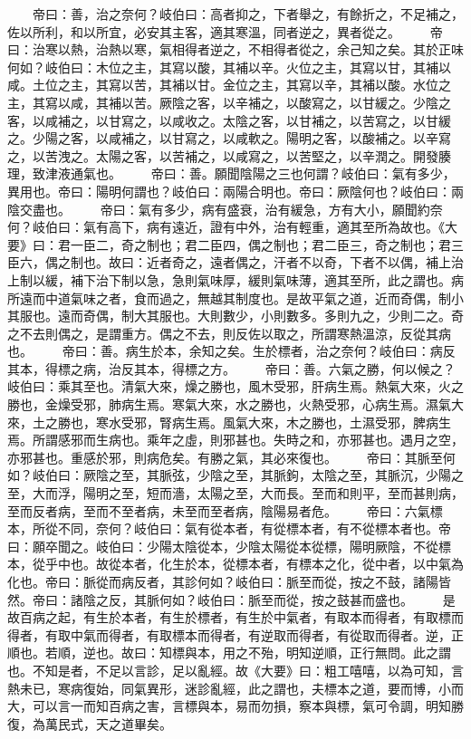　　帝曰：善，治之奈何？岐伯曰：高者抑之，下者舉之，有餘折之，不足補之，佐以所利，和以所宜，必安其主客，適其寒溫，同者逆之，異者從之。
　　帝曰：治寒以熱，治熱以寒，氣相得者逆之，不相得者從之，余己知之矣。其於正味何如？岐伯曰：木位之主，其寫以酸，其補以辛。火位之主，其寫以甘，其補以咸。土位之主，其寫以苦，其補以甘。金位之主，其寫以辛，其補以酸。水位之主，其寫以咸，其補以苦。厥陰之客，以辛補之，以酸寫之，以甘緩之。少陰之客，以咸補之，以甘寫之，以咸收之。太陰之客，以甘補之，以苦寫之，以甘緩之。少陽之客，以咸補之，以甘寫之，以咸軟之。陽明之客，以酸補之。以辛寫之，以苦洩之。太陽之客，以苦補之，以咸寫之，以苦堅之，以辛潤之。開發腠理，致津液通氣也。
　　帝曰：善。願聞陰陽之三也何謂？岐伯曰：氣有多少，異用也。帝曰：陽明何謂也？岐伯曰：兩陽合明也。帝曰：厥陰何也？岐伯曰：兩陰交盡也。
　　帝曰：氣有多少，病有盛衰，治有緩急，方有大小，願聞約奈何？岐伯曰：氣有高下，病有遠近，證有中外，治有輕重，適其至所為故也。《大要》曰：君一臣二，奇之制也；君二臣四，偶之制也；君二臣三，奇之制也；君三臣六，偶之制也。故曰：近者奇之，遠者偶之，汗者不以奇，下者不以偶，補上治上制以緩，補下治下制以急，急則氣味厚，緩則氣味薄，適其至所，此之謂也。病所遠而中道氣味之者，食而過之，無越其制度也。是故平氣之道，近而奇偶，制小其服也。遠而奇偶，制大其服也。大則數少，小則數多。多則九之，少則二之。奇之不去則偶之，是謂重方。偶之不去，則反佐以取之，所謂寒熱溫涼，反從其病也。
　　帝曰：善。病生於本，余知之矣。生於標者，治之奈何？岐伯曰：病反其本，得標之病，治反其本，得標之方。
　　帝曰：善。六氣之勝，何以候之？岐伯曰：乘其至也。清氣大來，燥之勝也，風木受邪，肝病生焉。熱氣大來，火之勝也，金燥受邪，肺病生焉。寒氣大來，水之勝也，火熱受邪，心病生焉。濕氣大來，土之勝也，寒水受邪，腎病生焉。風氣大來，木之勝也，土濕受邪，脾病生焉。所謂感邪而生病也。乘年之虛，則邪甚也。失時之和，亦邪甚也。遇月之空，亦邪甚也。重感於邪，則病危矣。有勝之氣，其必來復也。
　　帝曰：其脈至何如？岐伯曰：厥陰之至，其脈弦，少陰之至，其脈鉤，太陰之至，其脈沉，少陽之至，大而浮，陽明之至，短而濇，太陽之至，大而長。至而和則平，至而甚則病，至而反者病，至而不至者病，未至而至者病，陰陽易者危。
　　帝曰：六氣標本，所從不同，奈何？岐伯曰：氣有從本者，有從標本者，有不從標本者也。帝曰：願卒聞之。岐伯曰：少陽太陰從本，少陰太陽從本從標，陽明厥陰，不從標本，從乎中也。故從本者，化生於本，從標本者，有標本之化，從中者，以中氣為化也。帝曰：脈從而病反者，其診何如？岐伯曰：脈至而從，按之不鼓，諸陽皆然。帝曰：諸陰之反，其脈何如？岐伯曰：脈至而從，按之鼓甚而盛也。
　　是故百病之起，有生於本者，有生於標者，有生於中氣者，有取本而得者，有取標而得者，有取中氣而得者，有取標本而得者，有逆取而得者，有從取而得者。逆，正順也。若順，逆也。故曰：知標與本，用之不殆，明知逆順，正行無問。此之謂也。不知是者，不足以言診，足以亂經。故《大要》曰：粗工嘻嘻，以為可知，言熱未已，寒病復始，同氣異形，迷診亂經，此之謂也，夫標本之道，要而博，小而大，可以言一而知百病之害，言標與本，易而勿損，察本與標，氣可令調，明知勝復，為萬民式，天之道畢矣。
